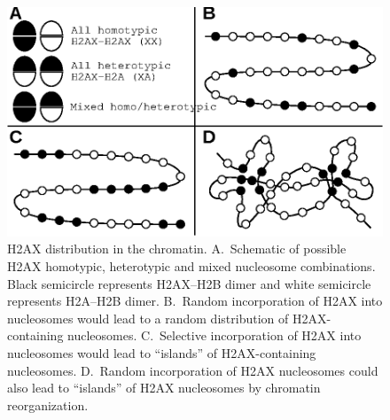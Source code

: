 \documentclass[graybox]{svmult}
\begin{document}
\begin{figure}
\includegraphics{Fig6}
\caption{H2AX distribution in the chromatin. A.~Schematic of possible H2AX homotypic, heterotypic and
mixed nucleosome combinations. Black semicircle represents H2AX--H2B dimer and white semicircle
represents H2A--H2B dimer. B.~Random incorporation of H2AX into nucleosomes would lead to a random
distribution of H2AX-containing nucleosomes. C.~Selective incorporation of H2AX into nucleosomes
would lead to ``islands'' of H2AX-containing nucleosomes. D.~Random incorporation of H2AX nucleosomes
could also lead to ``islands'' of H2AX nucleosomes by chromatin reorganization.}
\label{fig:H2AX-distribution}
\end{figure}

\newpage
\end{document}
